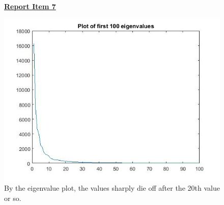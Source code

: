 \documentclass{article}
\begin{document}
\begin{figure}[H]
  \color{red}
  \underline{\textbf{Report Item 7}}
  \color{black}

\end{figure}

\begin{figure}[H]
\includegraphics[scale =.5]{report7_eig}
\\By the eigenvalue plot, the values sharply die off after the 20th value or so.
\end{figure}
\end{document}
